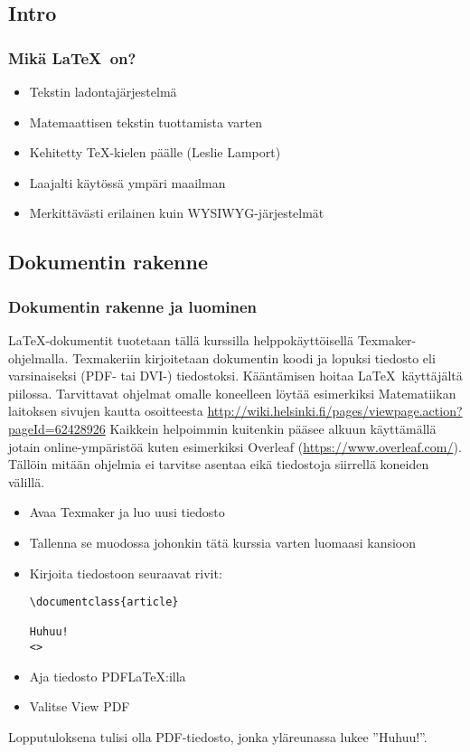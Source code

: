\subsection{Intro}
\begin{fframe}
    \frametitle{Mikä \LaTeX\  on?}
    \begin{itemize}[<+->]
        \item Tekstin ladontajärjestelmä
        \item Matemaattisen tekstin tuottamista varten
        \item Kehitetty \TeX -kielen päälle (Leslie Lamport)
        \item Laajalti käytössä ympäri maailman
        \item Merkittävästi erilainen kuin WYSIWYG-järjestelmät
    \end{itemize}
\end{fframe}


\subsection{Dokumentin rakenne}
\begin{fframe}
    \frametitle{Dokumentin rakenne ja luominen}
    \LaTeX-dokumentit tuotetaan tällä kurssilla helppokäyttöisellä Texmaker-ohjelmalla.
    \pause
    \vaihto
    Texmakeriin kirjoitetaan dokumentin koodi ja lopuksi tiedosto  eli  varsinaiseksi (PDF- tai DVI-) tiedostoksi. Kääntämisen hoitaa \LaTeX\ käyttäjältä piilossa.
    \pause
    \vaihto
    Tarvittavat ohjelmat omalle koneelleen löytää esimerkiksi Matematiikan laitoksen sivujen kautta osoitteesta
    \url{http://wiki.helsinki.fi/pages/viewpage.action?pageId=62428926}
    \pause
    \vaihto
    Kaikkein helpoimmin kuitenkin pääsee alkuun käyttämällä jotain online-ympäristöä kuten esimerkiksi Overleaf (\url{https://www.overleaf.com/}). Tällöin mitään ohjelmia ei tarvitse asentaa eikä tiedostoja siirrellä koneiden välillä.
\end{fframe}

\begin{fframe}
    \begin{harj}
        \begin{itemize}
            \item Avaa Texmaker ja luo uusi tiedosto
            \item Tallenna se muodossa  johonkin tätä kurssia varten luomaasi kansioon
            \item Kirjoita tiedostoon seuraavat rivit:
                \begin{lstlisting}
\documentclass{article}

Huhuu!
<>
                \end{lstlisting}
            \item Aja tiedosto PDFLaTeX:illa
            \item Valitse View PDF
        \end{itemize}
        Lopputuloksena tulisi olla PDF-tiedosto, jonka yläreunassa lukee ''Huhuu!''.
    \end{harj}
\end{fframe}

